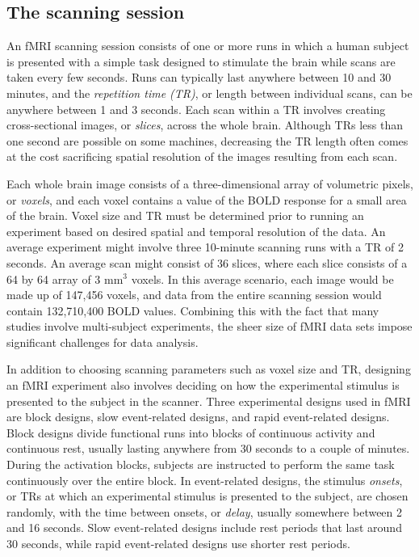 \subsection{The scanning session \label{sec:fmri:scan}}

An fMRI scanning session consists of one or more runs in which a human subject is presented with a simple task designed to stimulate the brain while scans are taken every few seconds. Runs can typically last anywhere between 10 and 30 minutes, and the \emph{repetition time (TR)}, or length between individual scans, can be anywhere between 1 and 3 seconds. Each scan within a TR involves creating cross-sectional images, or \emph{slices}, across the whole brain. Although TRs less than one second are possible on some machines, decreasing the TR length often comes at the cost sacrificing spatial resolution of the images resulting from each scan.

Each whole brain image consists of a three-dimensional array of volumetric pixels, or \emph{voxels}, and each voxel contains a value of the BOLD response for a small area of the brain. Voxel size and TR must be determined prior to running an experiment based on desired spatial and temporal resolution of the data. An average experiment might involve three 10-minute scanning runs with a TR of 2 seconds. An average scan might consist of 36 slices, where each slice consists of a 64 by 64 array of 3 $\mbox{mm}^3$ voxels. In this average scenario, each image would be made up of 147,456 voxels, and data from the entire scanning session would contain 132,710,400 BOLD values. Combining this with the fact that many studies involve multi-subject experiments, the sheer size of fMRI data sets impose significant challenges for data analysis.

In addition to choosing scanning parameters such as voxel size and TR, designing an fMRI experiment also involves deciding on how the experimental stimulus is presented to the subject in the scanner. Three experimental designs used in fMRI are block designs, slow event-related designs, and rapid event-related designs. Block designs divide functional runs into blocks of continuous activity and continuous rest, usually lasting anywhere from 30 seconds to a couple of minutes. During the activation blocks, subjects are instructed to perform the same task continuously over the entire block. In event-related designs, the stimulus \emph{onsets}, or TRs at which an experimental stimulus is presented to the subject, are chosen randomly, with the time between onsets, or \emph{delay}, usually somewhere between 2 and 16 seconds. Slow event-related designs include rest periods that last around 30 seconds, while rapid event-related designs use shorter rest periods.

